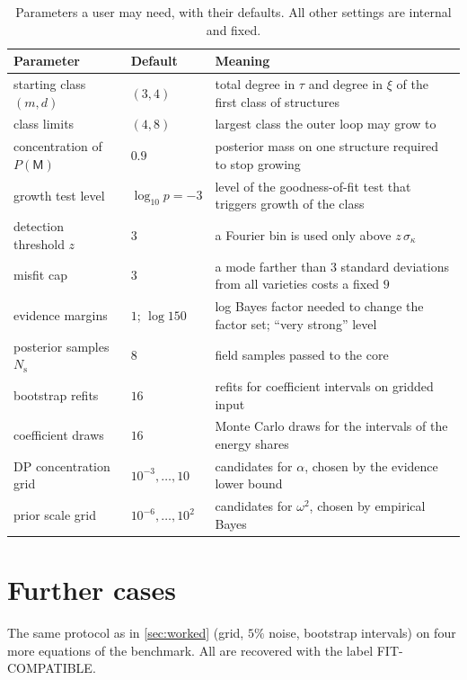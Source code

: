 \documentclass[11pt]{article}
\theoremstyle{plain}
\theoremstyle{definition}
\theoremstyle{remark}
\newcommand{\sigbin}{\sigma_{\kappa}}       %
\newcommand{\Nsamp}{N_{\mathrm s}}          %
\newcommand{\Mfit}{\mathsf{M}}              %
\newcommand{\lab}[1]{\textsf{#1}}           %
\newcommand{\FC}{\lab{FIT-COMPATIBLE}}
\begin{document}
\begin{table}[htbp]
\centering\small
\caption{Parameters a user may need, with their defaults. All other settings are internal and fixed.}\label{tab:params}
\begin{tabularx}{\linewidth}{@{}l l X@{}}
\toprule
Parameter & Default & Meaning\\
\midrule
starting class $(m,d)$ & $(3,4)$ & total degree in $\tau$ and degree in $\xi$ of the first class of structures\\
class limits & $(4,8)$ & largest class the outer loop may grow to\\
concentration of $P(\Mfit)$ & $0.9$ & posterior mass on one structure required to stop growing\\
growth test level & $\log_{10}p=-3$ & level of the goodness-of-fit test that triggers growth of the class\\
detection threshold $z$ & $3$ & a Fourier bin is used only above $z\,\sigbin$\\
misfit cap & $3$ & a mode farther than $3$ standard deviations from all varieties costs a fixed $9$\\
evidence margins & $1$; $\log150$ & log Bayes factor needed to change the factor set; ``very strong'' level~\cite{KasRaf95}\\
posterior samples $\Nsamp$ & $8$ & field samples passed to the core\\
bootstrap refits & $16$ & refits for coefficient intervals on gridded input\\
coefficient draws & $16$ & Monte Carlo draws for the intervals of the energy shares\\
DP concentration grid & $10^{-3},\dots,10$ & candidates for $\alpha$, chosen by the evidence lower bound\\
prior scale grid & $10^{-6},\dots,10^{2}$ & candidates for $\omega^2$, chosen by empirical Bayes\\
\bottomrule
\end{tabularx}
\end{table}

\section{Further cases}\label{app:cases}
The same protocol as in \cref{sec:worked} (grid, $5\%$ noise, bootstrap intervals) on four more equations of the
benchmark. All are recovered with the label \FC.
\end{document}
